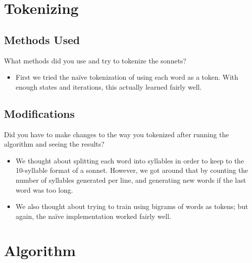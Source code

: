 \newif\ifshowsolutions
\showsolutionsfalse

\newcommand{\boldline}[1]{\underline{\textbf{#1}}}



\pagestyle{fancy}

\section{Tokenizing}
\subsection{Methods Used}
What methods did you use and try to tokenize the sonnets?
\begin{itemize}
	\item First we tried the na\"ive tokenization of using each word as a token.  With enough states and iterations, this actually learned fairly well.
\end{itemize}

\subsection{Modifications}
Did you have to make changes to the way you tokenized after running the algorithm and seeing the results?
\begin{itemize}
	\item We thought about splitting each word into syllables in order to keep to the 10-syllable format of a sonnet.  However, we got around that by counting the number of syllables generated per line, and generating new words if the last word was too long.
	\item We also thought about trying to train using bigrams of words as tokens; but again, the na\"ive implementation worked fairly well.
\end{itemize}



\section{Algorithm}
